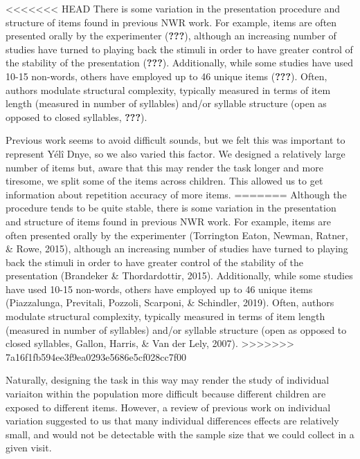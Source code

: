 \documentclass[english,,man,floatsintext]{apa6}
\begin{document}
<<<<<<< HEAD
There is some variation in the presentation procedure and structure of items found in previous NWR work. For example, items are often presented orally by the experimenter ({\textbf{???}}), although an increasing number of studies have turned to playing back the stimuli in order to have greater control of the stability of the presentation ({\textbf{???}}). Additionally, while some studies have used 10-15 non-words, others have employed up to 46 unique items ({\textbf{???}}). Often, authors modulate structural complexity, typically measured in terms of item length (measured in number of syllables) and/or syllable structure (open as opposed to closed syllables, {\textbf{???}}).

Previous work seems to avoid difficult sounds, but we felt this was important to represent Yélî Dnye, so we also varied this factor. We designed a relatively large number of items but, aware that this may render the task longer and more tiresome, we split some of the items across children. This allowed us to get information about repetition accuracy of more items.
=======
Although the procedure tends to be quite stable, there is some variation in the presentation and structure of items found in previous NWR work. For example, items are often presented orally by the experimenter (Torrington Eaton, Newman, Ratner, \& Rowe, 2015), although an increasing number of studies have turned to playing back the stimuli in order to have greater control of the stability of the presentation (Brandeker \& Thordardottir, 2015). Additionally, while some studies have used 10-15 non-words, others have employed up to 46 unique items (Piazzalunga, Previtali, Pozzoli, Scarponi, \& Schindler, 2019). Often, authors modulate structural complexity, typically measured in terms of item length (measured in number of syllables) and/or syllable structure (open as opposed to closed syllables, Gallon, Harris, \& Van der Lely, 2007).
>>>>>>> 7a16f1fb594ee3f9ea0293e5686e5cf028cc7f00

Naturally, designing the task in this way may render the study of individual variaiton within the population more difficult because different children are exposed to different items. However, a review of previous work on individual variation suggested to us that many individual differences effects are relatively small, and would not be detectable with the sample size that we could collect in a given visit.
\end{document}

